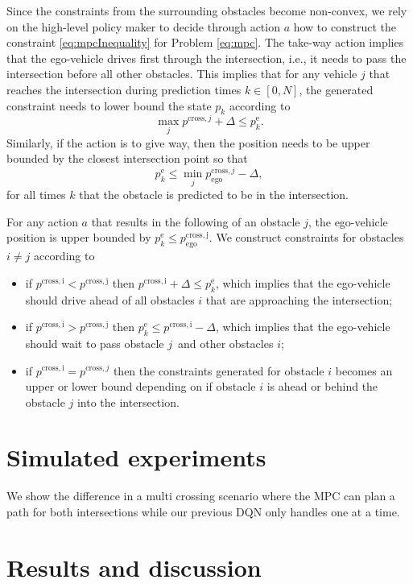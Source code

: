 Since the constraints from the surrounding obstacles become non-convex, we rely on the high-level policy maker to decide through action $a$ how to construct the constraint \eqref{eq:mpcInequality} for Problem \eqref{eq:mpc}. The take-way action implies that the ego-vehicle drives first through the intersection, i.e., it needs to pass the intersection before all other obstacles. This implies that for any vehicle $j$ that reaches the intersection during prediction times $k\in[0,N]$, the generated constraint needs to lower bound the state $p_k$ according to
\begin{equation}
\max_{j}p^{\mathrm{cross},j}+\Delta \leq{}p_k^\mathrm{e}.
\end{equation}
Similarly, if the action is to give way, then the position needs to be upper bounded by the closest intersection point so that
\begin{equation}
p_k^\mathrm{e} \leq{} \min_{j}p^{\mathrm{cross},j}_\mathrm{ego}-\Delta,
\end{equation} 
for all times $k$ that the obstacle is predicted to be in the intersection.

For any action $a$ that results in the following of an obstacle $j$, the ego-vehicle position is upper bounded by $p^\mathrm{e}_k \leq{} p^\mathrm{cross,j}_\mathrm{ego}$. We construct constraints for obstacles $i\neq{}j$ according to
\begin{itemize}
	\item if $p^\mathrm{cross,i}<{}p^\mathrm{cross,j}$ then $p^\mathrm{cross,i}+\Delta\leq{}p_k^\mathrm{e}$, which implies that the ego-vehicle should drive ahead of all obstacles $i$ that are approaching the intersection;
	\item if $p^\mathrm{cross,i}>{}p^\mathrm{cross,j}$ then $p_k^\mathrm{e}\leq{}p^\mathrm{cross,i}-\Delta$, which implies that the ego-vehicle should wait to pass obstacle $j$ and other obstacles $i$;
	\item if $p^{\mathrm{cross,i}}=p^{\mathrm{cross},j}$ then the constraints generated for obstacle $i$ becomes an upper or lower  bound depending on if obstacle $i$ is ahead or behind the obstacle $j$ into the intersection.
\end{itemize}


\section{Simulated experiments}
We show the difference in a multi crossing scenario where the MPC can plan a path for both intersections while our previous DQN only handles one at a time. 

\section{Results and discussion}
